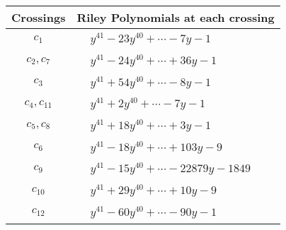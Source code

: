 \documentclass[1p]{elsarticle_modified}
\theoremstyle{definition}
\begin{document}
\begin{tabular}{m{50pt}|m{274pt}}
Crossings & \hspace{64pt}Riley Polynomials at each crossing \\
\hline $$\begin{aligned}c_{1}\end{aligned}$$&$\begin{aligned}
&y^{41}-23 y^{40}+\cdots-7 y-1
\end{aligned}$\\
\hline $$\begin{aligned}c_{2},c_{7}\end{aligned}$$&$\begin{aligned}
&y^{41}-24 y^{40}+\cdots+36 y-1
\end{aligned}$\\
\hline $$\begin{aligned}c_{3}\end{aligned}$$&$\begin{aligned}
&y^{41}+54 y^{40}+\cdots-8 y-1
\end{aligned}$\\
\hline $$\begin{aligned}c_{4},c_{11}\end{aligned}$$&$\begin{aligned}
&y^{41}+2 y^{40}+\cdots-7 y-1
\end{aligned}$\\
\hline $$\begin{aligned}c_{5},c_{8}\end{aligned}$$&$\begin{aligned}
&y^{41}+18 y^{40}+\cdots+3 y-1
\end{aligned}$\\
\hline $$\begin{aligned}c_{6}\end{aligned}$$&$\begin{aligned}
&y^{41}-18 y^{40}+\cdots+103 y-9
\end{aligned}$\\
\hline $$\begin{aligned}c_{9}\end{aligned}$$&$\begin{aligned}
&y^{41}-15 y^{40}+\cdots-22879 y-1849
\end{aligned}$\\
\hline $$\begin{aligned}c_{10}\end{aligned}$$&$\begin{aligned}
&y^{41}+29 y^{40}+\cdots+10 y-9
\end{aligned}$\\
\hline $$\begin{aligned}c_{12}\end{aligned}$$&$\begin{aligned}
&y^{41}-60 y^{40}+\cdots-90 y-1
\end{aligned}$\\
\hline
\end{tabular}\\~\\
\end{document}
